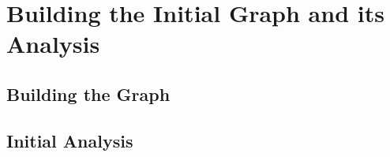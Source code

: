 \chapter{Building the Initial Graph and its Analysis}\label{ch:graph-analisys}

\section{Building the Graph}\label{sec:graph-building}


\section{Initial Analysis}\label{sec:initial-analysis}
